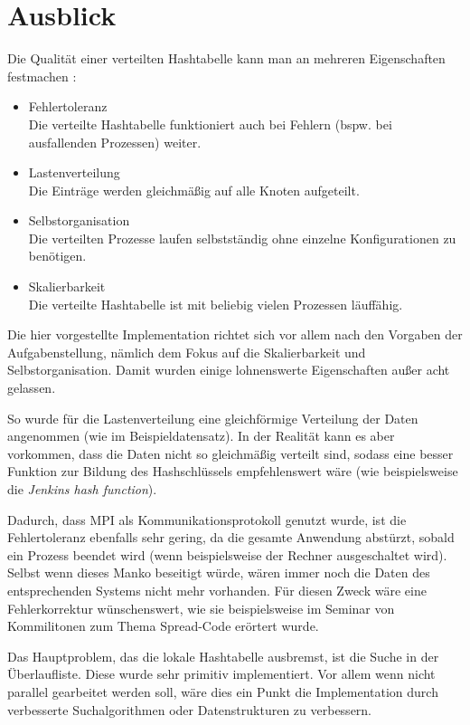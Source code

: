 \documentclass{scrreprt}
\begin{document}
\section{Ausblick}
Die Qualität einer verteilten Hashtabelle kann man an mehreren Eigenschaften festmachen%
:
\begin{itemize}
\item Fehlertoleranz\\
Die verteilte Hashtabelle funktioniert auch bei Fehlern (bspw. bei ausfallenden Prozessen) weiter.
\item Lastenverteilung\\
Die Einträge werden gleichmäßig auf alle Knoten aufgeteilt.
\item Selbstorganisation\\
Die verteilten Prozesse laufen selbstständig ohne einzelne Konfigurationen zu benötigen.
\item Skalierbarkeit\\
Die verteilte Hashtabelle ist mit beliebig vielen Prozessen läuffähig.
\end{itemize}

Die hier vorgestellte Implementation richtet sich vor allem nach den Vorgaben der Aufgabenstellung, nämlich dem Fokus auf die Skalierbarkeit und Selbstorganisation. Damit wurden einige lohnenswerte Eigenschaften außer acht gelassen. 

So wurde für die Lastenverteilung eine gleichförmige Verteilung der Daten angenommen (wie im Beispieldatensatz). In der Realität kann es aber vorkommen, dass die Daten nicht so gleichmäßig verteilt sind, sodass eine besser Funktion zur Bildung des Hashschlüssels empfehlenswert wäre (wie beispielsweise die \emph{Jenkins hash function}).

Dadurch, dass MPI als Kommunikationsprotokoll genutzt wurde, ist die Fehlertoleranz ebenfalls sehr gering, da die gesamte Anwendung abstürzt, sobald ein Prozess beendet wird (wenn beispielsweise der Rechner ausgeschaltet wird). Selbst wenn dieses Manko beseitigt würde, wären immer noch die Daten des entsprechenden Systems nicht mehr vorhanden. Für diesen Zweck wäre eine Fehlerkorrektur wünschenswert, wie sie beispielsweise im Seminar von Kommilitonen zum Thema Spread-Code erörtert wurde.

Das Hauptproblem, das die lokale Hashtabelle ausbremst, ist die Suche in der Überlaufliste. Diese wurde sehr primitiv implementiert. Vor allem wenn nicht parallel gearbeitet werden soll, wäre dies ein Punkt die Implementation durch verbesserte Suchalgorithmen oder Datenstrukturen zu verbessern. 
\end{document}
